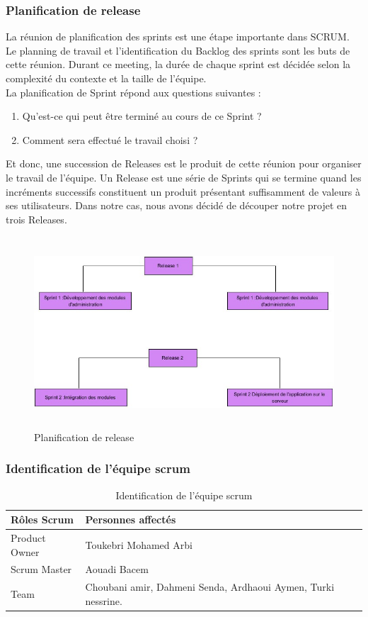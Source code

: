 \documentclass{article}
\begin{document}
\subsubsection{Planification de release}
La réunion de planification des sprints est une étape importante dans SCRUM. Le planning de travail et l'identification du Backlog des sprints sont les buts de cette réunion. Durant ce meeting, la durée de chaque sprint est décidée selon la complexité du contexte et la taille de l'équipe.\\
La planification de Sprint répond aux questions suivantes :
\begin{enumerate}
\item Qu’est-ce qui peut être terminé au cours de ce Sprint ?
\item Comment sera effectué le travail choisi ?
\end{enumerate}
Et donc, une succession de Releases est le produit de cette réunion pour organiser le travail de l'équipe. Un Release est une série de Sprints qui se termine quand les incréments successifs constituent un produit présentant suffisamment de valeurs à ses utilisateurs. Dans notre cas, nous avons décidé de découper notre projet en trois Releases.
\begin{figure}[H]
\centering
\includegraphics[height=2.8in]{Planification.jpg}
\caption[Figure 2 : Planification de release]{Planification de release}
\label{fig:pic2}
\end{figure}
\subsubsection{Identification de l’équipe scrum}
\begin{table}[H]
\centering
\label{tab:tab3} 
 \begin{tabularx}{\textwidth}{|X|X|}
\hline
\bfseries{ Rôles Scrum} &\bfseries{ Personnes affectés} \\ \hline
Product Owner& Toukebri Mohamed Arbi \\
\hline
Scrum Master& Aouadi Bacem \\
\hline 
Team&Choubani amir, Dahmeni Senda, Ardhaoui Aymen, Turki nessrine.\\
 
\hline
\end{tabularx}
\caption[tableau3 : Identification de l'équipe scrum]{Identification de l'équipe scrum}
\end{table}
\end{document}
